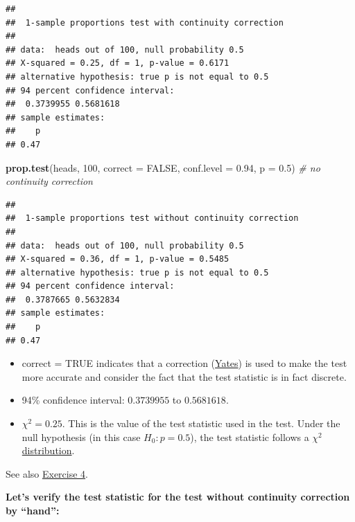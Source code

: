 \documentclass[
]{book}
\newenvironment{Shaded}{\begin{snugshade}}{\end{snugshade}}
\newcommand{\AttributeTok}[1]{\textcolor[rgb]{0.13,0.29,0.53}{#1}}
\newcommand{\CommentTok}[1]{\textcolor[rgb]{0.56,0.35,0.01}{\textit{#1}}}
\newcommand{\ConstantTok}[1]{\textcolor[rgb]{0.56,0.35,0.01}{#1}}
\newcommand{\DecValTok}[1]{\textcolor[rgb]{0.00,0.00,0.81}{#1}}
\newcommand{\FloatTok}[1]{\textcolor[rgb]{0.00,0.00,0.81}{#1}}
\newcommand{\FunctionTok}[1]{\textcolor[rgb]{0.13,0.29,0.53}{\textbf{#1}}}
\newcommand{\NormalTok}[1]{#1}
\begin{document}
\begin{verbatim}
## 
##  1-sample proportions test with continuity correction
## 
## data:  heads out of 100, null probability 0.5
## X-squared = 0.25, df = 1, p-value = 0.6171
## alternative hypothesis: true p is not equal to 0.5
## 94 percent confidence interval:
##  0.3739955 0.5681618
## sample estimates:
##    p 
## 0.47
\end{verbatim}

\begin{Shaded}
\begin{Highlighting}[]
\FunctionTok{prop.test}\NormalTok{(heads, }\DecValTok{100}\NormalTok{,}
          \AttributeTok{correct =} \ConstantTok{FALSE}\NormalTok{,}
          \AttributeTok{conf.level =} \FloatTok{0.94}\NormalTok{, }\AttributeTok{p =} \FloatTok{0.5}\NormalTok{) }\CommentTok{\# no continuity correction}
\end{Highlighting}
\end{Shaded}

\begin{verbatim}
## 
##  1-sample proportions test without continuity correction
## 
## data:  heads out of 100, null probability 0.5
## X-squared = 0.36, df = 1, p-value = 0.5485
## alternative hypothesis: true p is not equal to 0.5
## 94 percent confidence interval:
##  0.3787665 0.5632834
## sample estimates:
##    p 
## 0.47
\end{verbatim}

\begin{itemize}
\item
  correct = TRUE indicates that a correction (\href{https://en.wikipedia.org/wiki/Yates\%27s_correction_for_continuity}{Yates})
  is used to make the test more accurate and consider the fact that the test statistic is in fact discrete.
\item
  94\% confidence interval: \(0.3739955\) to \(0.5681618\).
\item
  \(\chi^2 = 0.25\). This is the value of the test statistic used in the test.
  Under the null hypothesis (in this case \(H_0: p = 0.5\)),
  the test statistic follows a \href{https://en.wikipedia.org/wiki/Chi-squared_distribution}{\(\chi^2\) distribution}.
\end{itemize}

See also \hyperref[exercise4_nhst]{Exercise 4}.

\textbf{Let's verify the test statistic for the test without continuity correction by ``hand'':}
\end{document}
